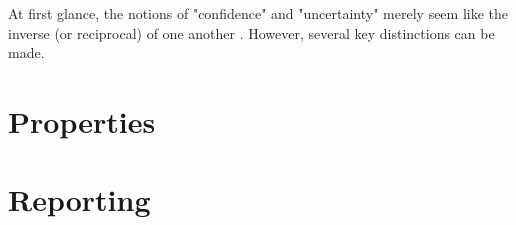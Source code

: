 At first glance, the notions of "\gls{confidence}" and "\gls{uncertainty}" merely seem like the inverse (or reciprocal) of one another \cite{meynielConfidenceBayesianProbability2015}. However, several key distinctions can be made.

\section{Properties}

\section{Reporting}